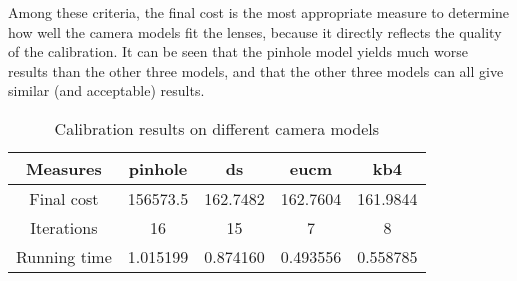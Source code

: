 \documentclass[a4paper, 12pt]{article}
\begin{document}
        Among these criteria, the final cost is the most appropriate measure to determine how well the camera models fit the lenses, because it directly reflects the quality of the calibration. It can be seen that the pinhole model yields much worse results than the other three models, and that the other three models can all give similar (and acceptable) results.
        \begin{table}[h]
            \renewcommand{\arraystretch}{1.4}
            \caption{Calibration results on different camera models}
            \label{calib_res}
            \centering
            \begin{tabular}{c|c|c|c|c}
                Measures & pinhole & ds & eucm & kb4 \\
                \hline
                Final cost   & 156573.5 & 162.7482 & 162.7604 & 161.9844 \\
                Iterations   &       16 &       15 &        7 &        8 \\
                Running time & 1.015199 & 0.874160 & 0.493556 & 0.558785
            \end{tabular}
        \end{table}
\end{document}
